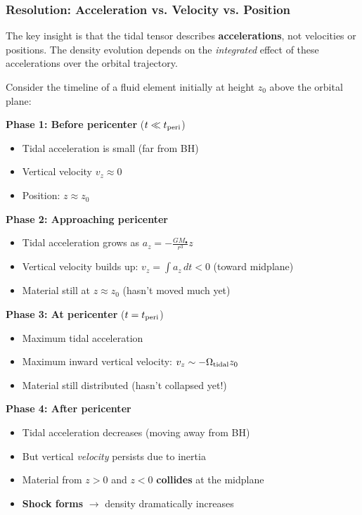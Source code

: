 \documentclass[twocolumn,amsmath,amssymb,prd,superscriptaddress,nofootinbib]{revtex4-2}
\begin{document}
\subsubsection{Resolution: Acceleration vs. Velocity vs. Position}

The key insight is that the tidal tensor describes \textbf{accelerations}, not velocities or positions. The density evolution depends on the \textit{integrated} effect of these accelerations over the orbital trajectory.

Consider the timeline of a fluid element initially at height $z_0$ above the orbital plane:

\textbf{Phase 1: Before pericenter} ($t \ll t_{\rm peri}$)
\begin{itemize}
    \item Tidal acceleration is small (far from BH)
    \item Vertical velocity $v_z \approx 0$
    \item Position: $z \approx z_0$
\end{itemize}

\textbf{Phase 2: Approaching pericenter}
\begin{itemize}
    \item Tidal acceleration grows as $a_z = -\frac{GM_\bullet}{r^3} z$
    \item Vertical velocity builds up: $v_z = \int a_z \, dt < 0$ (toward midplane)
    \item Material still at $z \approx z_0$ (hasn't moved much yet)
\end{itemize}

\textbf{Phase 3: At pericenter} ($t = t_{\rm peri}$)
\begin{itemize}
    \item Maximum tidal acceleration
    \item Maximum inward vertical velocity: $v_z \sim -\Omega_{\rm tidal} z_0$
    \item Material still distributed (hasn't collapsed yet!)
\end{itemize}

\textbf{Phase 4: After pericenter}
\begin{itemize}
    \item Tidal acceleration decreases (moving away from BH)
    \item But vertical \textit{velocity} persists due to inertia
    \item Material from $z > 0$ and $z < 0$ \textbf{collides} at the midplane
    \item \textbf{Shock forms} $\rightarrow$ density dramatically increases
\end{itemize}
\end{document}
